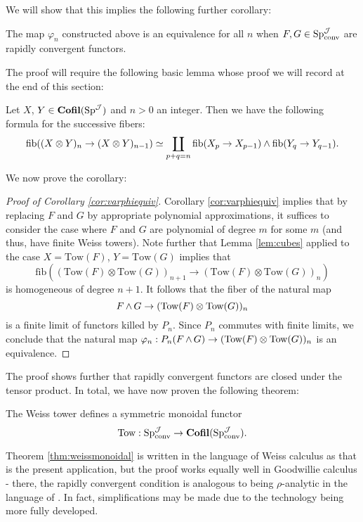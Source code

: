 We will show that this implies the following further corollary:

\begin{cor}\label{cor:varphiequiv}
The map $\varphi_n$ constructed above is an equivalence for all $n$ when $F,G\in \operatorname{\mathrm{Sp}}^{\operatorname{\mathcal{J}}}_{\text{conv}}$ are rapidly convergent functors.  
\end{cor}
The proof will require the following basic lemma whose proof we will record at the end of this section: 
\begin{lem}\label{lem:cubes}
Let $X$, $Y \in \operatorname{\mathbf{Cofil}}(\operatorname{\mathrm{Sp}}^{\operatorname{\mathcal{J}}})$ and $n>0$ an integer.  Then we have the following formula for the successive fibers: $$\operatorname{\mathrm{fib}} ((X\otimes Y)_{n} \to (X\otimes Y)_{n-1}) \simeq \coprod_{p+q=n} \operatorname{\mathrm{fib}} (X_p\to X_{p-1}) \wedge \operatorname{\mathrm{fib}} (Y_q \to Y_{q-1}).$$
\end{lem}

We now prove the corollary:

\begin{proof}[Proof of Corollary \ref{cor:varphiequiv}]
Corollary \ref{cor:varphiequiv} implies that by replacing $F$ and $G$ by appropriate polynomial approximations, it suffices to consider the case where $F$ and $G$ are polynomial of degree $m$ for some $m$ (and thus, have finite Weiss towers).   Note further that Lemma \ref{lem:cubes} applied to the case $X = \text{Tow}(F)$, $Y=\text{Tow}(G)$ implies that $$\text{fib}((\text{Tow}(F)\otimes \text{Tow}(G) )_{n+1} \to (\text{Tow}(F) \otimes \text{Tow}(G))_n)$$ is homogeneous of degree $n+1$.  It follows that the fiber of the natural map $$F\operatorname{\wedge} G \to (\text{Tow}(F)\otimes \text{Tow}(G))_n$$  is a finite limit of functors killed by $P_n$.  Since $P_n$ commutes with finite limits, we conclude that the natural map $\varphi_n: P_n(F\operatorname{\wedge} G)\to (\text{Tow}(F)\otimes \text{Tow}(G))_n$ is an equivalence.  
\end{proof}

The proof shows further that rapidly convergent functors are closed under the tensor product.  In total, we have now proven the following theorem:

\begin{thm}\label{thm:weissmonoidal}
The Weiss tower defines a symmetric monoidal functor $$\text{Tow}: \operatorname{\mathrm{Sp}}^{\operatorname{\mathcal{J}}}_{\text{conv}} \to \operatorname{\mathbf{Cofil}}(\operatorname{\mathrm{Sp}}^{\operatorname{\mathcal{J}}}_{\text{conv}}).$$
\end{thm}
\begin{rmk}
Theorem \ref{thm:weissmonoidal} is written in the language of Weiss calculus as that is the present application, but the proof works equally well in Goodwillie calculus - there, the rapidly convergent condition is analogous to being $\rho$-analytic in the language of \cite{GoodwillieII}.  In fact, simplifications may be made due to the technology being more fully developed.  %
\end{rmk}

